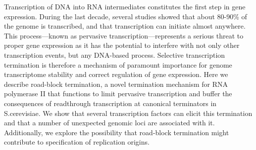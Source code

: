 Transcription of DNA into RNA intermediates constitutes the first step in gene expression. During the last decade, several studies showed that about 80-90\% of the genome is transcribed, and that transcription can initiate almost anywhere. This process—known as pervasive transcription—represents a serious threat to proper gene expression as it has the potential to interfere with not only other transcription events, but any DNA-based process. Selective transcription termination is therefore a mechanism of paramount importance for genome transcriptome stability and correct regulation of gene expression. Here we describe road-block termination, a novel termination mechanism for RNA polymerase II that functions to limit pervasive transcription and buffer the consequences of readthrough transcription at canonical terminators in S.cerevisiae. We show that several transcription factors can elicit this termination and that a number of unexpected genomic loci are associated with it. Additionally, we explore the possibility that road-block termination might contribute to specification of replication origins.
